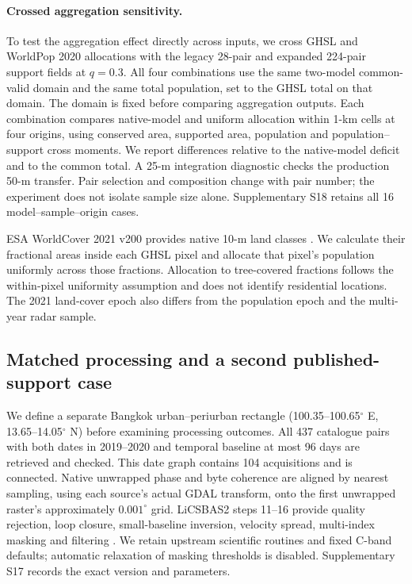 \documentclass[pdflatex,sn-nature]{sn-jnl}
\begin{document}
\paragraph{Crossed aggregation sensitivity.} To test the aggregation effect directly across inputs, we cross GHSL and WorldPop 2020 allocations with the legacy 28-pair and expanded 224-pair support fields at $q=0.3$. All four combinations use the same two-model common-valid domain and the same total population, set to the GHSL total on that domain. The domain is fixed before comparing aggregation outputs. Each combination compares native-model and uniform allocation within 1-km cells at four origins, using conserved area, supported area, population and population--support cross moments. We report differences relative to the native-model deficit and to the common total. A 25-m integration diagnostic checks the production 50-m transfer. Pair selection and composition change with pair number; the experiment does not isolate sample size alone. Supplementary S18 retains all 16 model--sample--origin cases.

ESA WorldCover 2021 v200 provides native 10-m land classes \citep{worldcover2021}. We calculate their fractional areas inside each GHSL pixel and allocate that pixel's population uniformly across those fractions. Allocation to tree-covered fractions follows the within-pixel uniformity assumption and does not identify residential locations. The 2021 land-cover epoch also differs from the population epoch and the multi-year radar sample.

\subsection{Matched processing and a second published-support case}
We define a separate Bangkok urban--periurban rectangle (100.35--100.65$^\circ$ E, 13.65--14.05$^\circ$ N) before examining processing outcomes. All 437 catalogue pairs with both dates in 2019--2020 and temporal baseline at most 96 days are retrieved and checked. This date graph contains 104 acquisitions and is connected. Native unwrapped phase and byte coherence are aligned by nearest sampling, using each source's actual GDAL transform, onto the first unwrapped raster's approximately $0.001^\circ$ grid. LiCSBAS2 steps 11--16 provide quality rejection, loop closure, small-baseline inversion, velocity spread, multi-index masking and filtering \citep{morishita2020licsbas,licsbas2}. We retain upstream scientific routines and fixed C-band defaults; automatic relaxation of masking thresholds is disabled. Supplementary S17 records the exact version and parameters.
\end{document}
